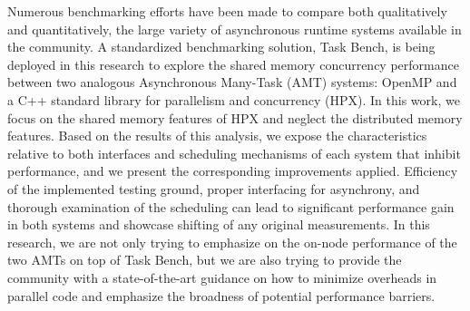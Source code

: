 Numerous benchmarking efforts have been made to compare both qualitatively and quantitatively, the large variety of asynchronous runtime systems available in the community. A standardized benchmarking solution, Task Bench, is being deployed in this research to explore the shared memory concurrency performance between two analogous Asynchronous Many-Task (AMT) systems: OpenMP and a C++ standard library for parallelism and concurrency (HPX). In this work, we focus on the shared memory features of HPX and neglect the distributed memory features. Based on the results of this analysis, we expose the characteristics relative to both interfaces and scheduling mechanisms of each system that inhibit performance, and we present the corresponding improvements applied. Efficiency of the implemented testing ground, proper interfacing for asynchrony, and thorough examination of the scheduling can lead to significant performance gain in both systems and showcase shifting of any original measurements. In this research, we are not only trying to emphasize on the on-node performance of the two AMTs on top of Task Bench, but we are also trying to provide the community with a state-of-the-art guidance on how to minimize overheads in parallel code and emphasize the broadness of potential performance barriers.